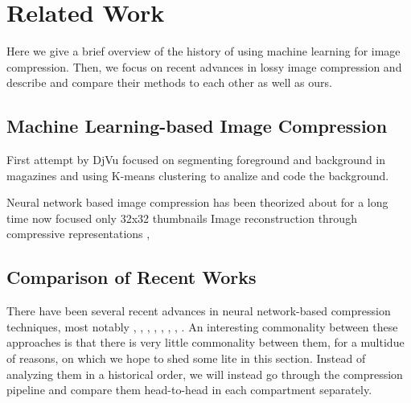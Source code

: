 \documentclass{article}
\begin{document}
\newpage

\tableofcontents

\newpage

%
%

%
%

\section{Related Work}
\par
Here we give a brief overview of the history of using machine learning for image
compression. Then, we focus on recent advances in lossy image compression and
describe and compare their methods to each other as well as ours.
\subsection{Machine Learning-based Image Compression}
\par

First attempt by \cite{bottou1998high} DjVu focused on segmenting foreground and
background in magazines and using K-means clustering to analize and code the
background.

Neural network based image compression has been theorized about for a long time
now \cite{mougeot1991image} \cite{jiang1999image} 
\cite{toderici2015variable} focused only 32x32 thumbnails
Image reconstruction through compressive representations \cite{denton2015deep},
\cite{gregor2015draw}

\subsection{Comparison of Recent Works}
\label{sec:lit_comparison}
\par

There have been several recent advances in neural network-based compression
techniques, most notably \cite{toderici2015variable}, \cite{balle2016end},
\cite{toderici2017full}, \cite{theis2017lossy}, \cite{rippel2017real},
\cite{balle2018variational}, \cite{johnston2018cvpr}, \cite{mentzer2018cvpr}. 
An interesting commonality between these approaches is that there is very little
commonality between them, for a multidue of reasons, on which we hope to shed
some lite in this section. Instead of analyzing them in a historical order, we
will instead go through the compression pipeline and compare them head-to-head
in each compartment separately. 
\end{document}
